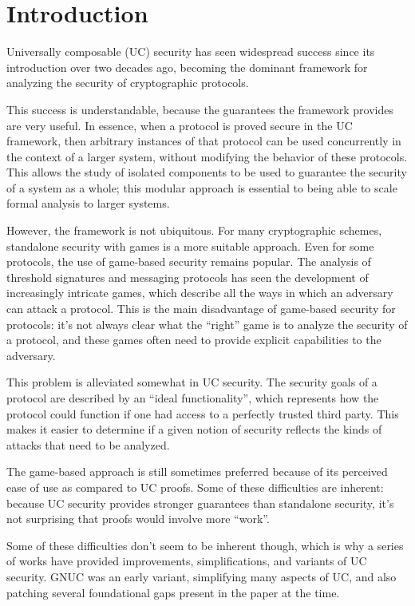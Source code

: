 \section{Introduction}

Universally composable (UC) security \cite{EPRINT:Canetti00}
has seen widespread success since its introduction over
two decades ago,
becoming the dominant framework for analyzing the security of cryptographic
protocols.

This success is understandable, because the guarantees
the framework provides are very useful.
In essence, when a protocol is proved secure in the UC framework,
then arbitrary instances of that protocol can be used concurrently in the context
of a larger system, without modifying the behavior
of these protocols.
This allows the study of isolated components to be used
to guarantee the security of a system as a whole;
this modular approach is essential to being able to scale
formal analysis to larger systems.

However, the framework is not ubiquitous.
For many cryptographic schemes, standalone security with games
is a more suitable approach.
Even for some protocols, the use of game-based security remains popular.
The analysis of threshold signatures and messaging protocols
has seen the development of increasingly intricate games,
which describe all the ways in which an adversary can attack a protocol.
This is the main disadvantage of game-based security for protocols:
it's not always clear what the ``right'' game is to analyze
the security of a protocol, and these games often need to provide
explicit capabilities to the adversary.

This problem is alleviated somewhat in UC security.
The security goals of a protocol are described by
an ``ideal functionality'',
which represents how the protocol could function if one had access
to a perfectly trusted third party.
This makes it easier to determine if a given notion of security
reflects the kinds of attacks that need to be analyzed.

The game-based approach is still sometimes preferred because of
its perceived ease of use as compared to UC proofs.
Some of these difficulties are inherent:
because UC security provides stronger guarantees than standalone
security, it's not surprising that proofs would involve more ``work''.

Some of these difficulties don't seem to be inherent though,
which is why a series of works have provided improvements,
simplifications, and variants of UC security.
GNUC \cite{JC:HofSho15} was an early variant,
simplifying many aspects of UC, and also patching several
foundational gaps present in the paper at the time.

